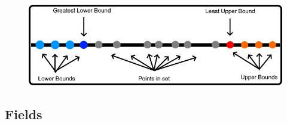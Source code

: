 	\begin{figure}[h]
		\centering
		\includegraphics[scale=0.5]{Images/1.2.2.png}
	\end{figure}

	\newpage





\subsection{ Fields }

